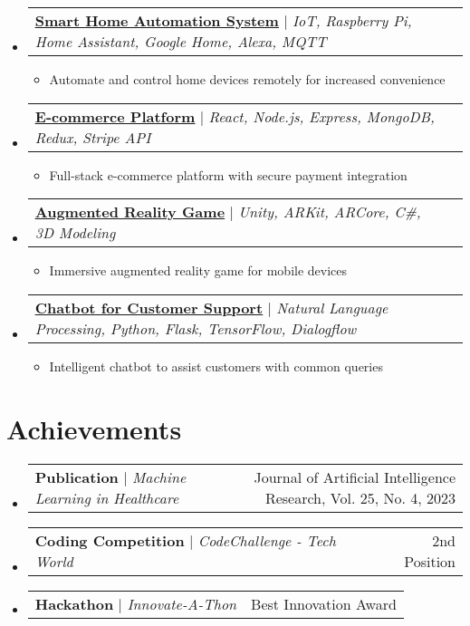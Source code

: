 \documentclass[letterpaper,11pt]{article}%
\makeatletter
\newcommand{\resumeItem}[1]{
  \item\small{
    {#1 \vspace{-2pt}}
  }
}
\newcommand{\resumeProjectHeading}[2]{
    \item
    \begin{tabular*}{0.97\textwidth}{l@{\extracolsep{\fill}}r}
      \small#1 & #2 \\
    \end{tabular*}\vspace{-7pt}
}
\newcommand{\resumeSubHeadingListStart}{\begin{itemize}[leftmargin=0.15in, label={}]}
\newcommand{\resumeSubHeadingListEnd}{\end{itemize}}
\newcommand{\resumeItemListStart}{\begin{itemize}}
\newcommand{\resumeItemListEnd}{\end{itemize}\vspace{-5pt}}
\makeatother
\begin{document}
%
\resumeSubHeadingListStart%
\resumeProjectHeading%
{\textbf{\href{https://github.com/JohnDoe/Smart-Home-Automation}{\underline{Smart Home Automation System}}} $|$ \footnotesize\emph{IoT, Raspberry Pi, Home Assistant, Google Home, Alexa, MQTT}}{}%
\resumeItemListStart%
\resumeItem{Automate and control home devices remotely for increased convenience}%
\resumeItemListEnd%
\resumeProjectHeading%
{\textbf{\href{https://github.com/JohnDoe/E-commerce-Platform}{\underline{E-commerce Platform}}} $|$ \footnotesize\emph{React, Node.js, Express, MongoDB, Redux, Stripe API}}{}%
\resumeItemListStart%
\resumeItem{Full{-}stack e{-}commerce platform with secure payment integration}%
\resumeItemListEnd%
\resumeProjectHeading%
{\textbf{\href{https://github.com/JohnDoe/AR-Game}{\underline{Augmented Reality Game}}} $|$ \footnotesize\emph{Unity, ARKit, ARCore, C\#, 3D Modeling}}{}%
\resumeItemListStart%
\resumeItem{Immersive augmented reality game for mobile devices}%
\resumeItemListEnd%
\resumeProjectHeading%
{\textbf{\href{https://github.com/JohnDoe/Customer-Support-Chatbot}{\underline{Chatbot for Customer Support}}} $|$ \footnotesize\emph{Natural Language Processing, Python, Flask, TensorFlow, Dialogflow}}{}%
\resumeItemListStart%
\resumeItem{Intelligent chatbot to assist customers with common queries}%
\resumeItemListEnd%
\resumeSubHeadingListEnd%
\section{Achievements}%
\label{sec:Achievements}%

%
\resumeSubHeadingListStart%
\resumeProjectHeading%
{\textbf{Publication} $|$ \footnotesize\emph{Machine Learning in Healthcare}}{Journal of Artificial Intelligence Research, Vol. 25, No. 4, 2023}%
\resumeProjectHeading%
{\textbf{Coding Competition} $|$ \footnotesize\emph{CodeChallenge - Tech World}}{2nd Position}%
\resumeProjectHeading%
{\textbf{Hackathon} $|$ \footnotesize\emph{Innovate-A-Thon}}{Best Innovation Award}%
\resumeSubHeadingListEnd%
\end{document}

